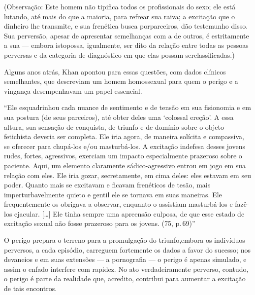 (Observação: Este homem não tipifica todos os profissionais do sexo;
ele está lutando, até mais do que a maioria, para refrear sua raiva; a
excitação que o dinheiro lhe transmite, e sua frenética busca por\idxprost[|)]
parceiros, dão testemunho disso. Sua perversão, apesar de apresentar
semelhanças com a de outros, é estritamente a sua --- embora isto\idxprosthom[|)]
possa, igualmente, ser dito da relação entre todas as pessoas perversas
e da categoria de diagnóstico em que elas possam ser\idxhomospros[|)] classificadas.)

Alguns anos atrás, Khan\idxkhan{} apontou para essas questões, com dados
clínicos semelhantes, que descreviam um homem homossexual para quem o
perigo e a vingança\idxhomosperi{} desempenhavam um papel essencial.

``Ele esquadrinhou cada nuance de sentimento e de
tensão em sua fisionomia e em sua postura (de seus parceiros), até
obter deles uma `colossal ereção'. A
essa altura, sua sensação de conquista, de triunfo e de domínio sobre o
objeto fetichista deveria ser completa. Ele iria agora, de maneira
solícita e compassiva, se oferecer para chupá-los e/ou masturbá-los. A
excitação indefesa desses jovens rudes, fortes, agressivos, exerciam um
impacto especialmente prazeroso sobre o paciente. Aqui, um elemento
claramente sádico-agressivo entrou em jogo em sua relação com eles. Ele
iria gozar, secretamente, em cima deles: eles estavam em seu poder.
Quanto mais se excitavam e ficavam frenéticos de tesão, mais
imperturbavelmente quieto e gentil ele se tornava em suas maneiras. Ele
frequentemente os obrigava a observar, enquanto o assistiam
masturbá-los e fazê-los ejacular. [\ldots{}] Ele tinha sempre uma apreensão
culposa, de que esse estado de excitação sexual não fosse prazeroso
para os jovens. (75, p.\,69)''

O perigo prepara o terreno para a promulgação do triunfo,\idxtraumapros[|)] embora os
indivíduos perversos, a cada episódio, carreguem fortemente os dados a
favor do sucesso; nos devaneios e em suas extensões --- a pornografia
--- o perigo é apenas simulado, e assim o enfado interfere com
rapidez. No ato verdadeiramente perverso, contudo, o perigo é parte da
realidade que, acredito, contribui para aumentar a excitação de tais
encontros.

